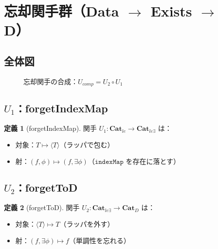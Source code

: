 \documentclass{ltjsarticle}
\theoremstyle{definition}
\newtheorem{definition}{定義}[section]
\newcommand{\catD}{\mathbf{Cat}_D}
\newcommand{\catle}{\mathbf{Cat}_{le}}
\newcommand{\catleexists}{\mathbf{Cat}_{le\exists}}
\newcommand{\indexMap}{\mathtt{indexMap}}
\begin{document}
\section{忘却関手群（Data $\to$ Exists $\to$ D）}

\subsection{全体図}

\begin{figure}[htbp]
\centering
{}
\caption{忘却関手の合成：$U_{comp} = U_2 \circ U_1$}
\label{fig:forgetful-functors}
\end{figure}

\subsection{$U_1$：forgetIndexMap}

\begin{definition}[forgetIndexMap]
関手 $U_1 : \catle \to \catleexists$ は：
\begin{itemize}
  \item 対象：$T \mapsto \langle T \rangle$（ラッパで包む）
  \item 射：$(f, \phi) \mapsto (f, \exists\phi)$（$\indexMap$ を存在に落とす）
\end{itemize}
\end{definition}

\subsection{$U_2$：forgetToD}

\begin{definition}[forgetToD]
関手 $U_2 : \catleexists \to \catD$ は：
\begin{itemize}
  \item 対象：$\langle T \rangle \mapsto T$（ラッパを外す）
  \item 射：$(f, \exists\phi) \mapsto f$（単調性を忘れる）
\end{itemize}
\end{definition}
\end{document}
